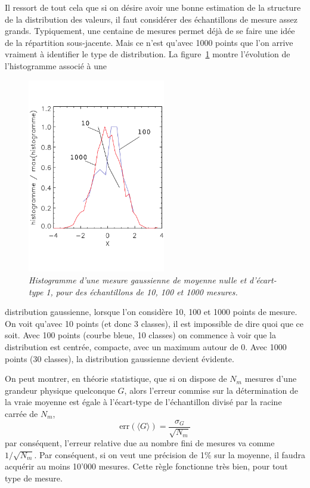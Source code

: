 Il ressort de tout cela que si on désire avoir une bonne estimation de la structure de la distribution des valeurs, il faut considérer des échantillons de mesure assez grands.  Typiquement, une centaine de mesures permet déjà de se faire une idée de la répartition sous-jacente. Mais ce n'est qu'avec 1000 points que l'on arrive vraiment à identifier le type de distribution. La figure~\ref{fig:h123} montre l'évolution de l'histogramme associé à une \begin{figure}
   \centering
   \includegraphics[width=6cm]{assets/figures/histGaussienDixCentMilleMesures.pdf}
   \caption{\it Histogramme d'une mesure gaussienne de moyenne nulle et d'écart-type 1, pour des échantillons de 10, 100 et 1000 mesures.}
   \label{fig:h123}
\end{figure}
distribution gaussienne, lorsque l'on considère 10, 100 et 1000 points de mesure. On voit qu'avec 10 points (et donc 3 classes), il est impossible de dire quoi que ce soit. Avec 100 points (courbe bleue, 10 classes) on commence à voir que la distribution est centrée, compacte, avec un maximum autour de 0. Avec 1000 points (30 classes), la distribution gaussienne devient évidente.

On peut montrer, en théorie statistique, que si on dispose de $N_m$ mesures d'une grandeur physique quelconque $G$, alors l'erreur commise sur la détermination de la vraie moyenne est égale à l'écart-type de l'échantillon divisé par la racine carrée de $N_m$,
\begin{equation}
\text{err}(\langle G\rangle)=\frac{\sigma_G}{\sqrt{N_m}}
\end{equation}
par conséquent, l'erreur relative due au nombre fini de mesures va comme $1/\sqrt{N_m}$. Par conséquent, si on veut une précision de 1\% sur la moyenne, il faudra acquérir au moins 10'000 mesures. Cette règle fonctionne très bien, pour tout type de mesure.


